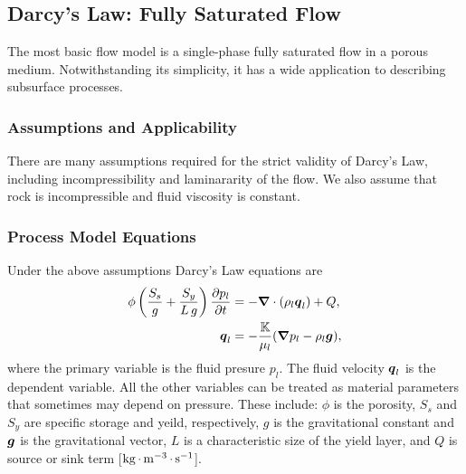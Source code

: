 
\subsection{Darcy's Law: Fully Saturated Flow}
\label{sec:flow-single-phase}

The most basic flow model is a single-phase fully saturated flow in a porous medium.  
Notwithstanding its simplicity, it has a wide application to
describing subsurface processes.


\subsubsection{Assumptions and Applicability}

There are many assumptions required for the strict validity of Darcy's Law, 
including incompressibility and laminararity of the flow.
We also assume that rock is incompressible and fluid viscosity is constant.


\subsubsection{Process Model Equations}

Under the above assumptions Darcy's Law equations are
\begin{subequations}
\label{eq:Darcy fully saturated}
\begin{align}
  \phi \left(\displaystyle \frac{S_s}{g} + \displaystyle \frac{S_y}{L\,g}\right) \frac{\partial p_l}{\partial t} 
  &=
  -\boldsymbol{\nabla} \cdot (\rho_l \boldsymbol{q}_l) + Q,
  \\
  {\boldsymbol{q}}_l &= -\frac{{\mathbb K}}{\mu_l} 
  ({\boldsymbol{\nabla}} p_l - \rho_l {\boldsymbol{g}}),
\end{align}
\end{subequations}
where the primary variable is the fluid presure $p_l$. 
The fluid velocity ${\boldsymbol{q}}_l$ is the dependent variable.
All the other variables can be treated as material parameters
that sometimes may depend on pressure.
These include:
$\phi$ is the porosity,
$S_s$ and $S_y$ are specific storage and yeild, respectively,
$g$ is the gravitational constant
and ${\boldsymbol{g}}$ is the gravitational vector,  
$L$ is a characteristic size of the yield layer, and 
$Q$ is source or sink term [${\rm kg} {\,\cdot\,} {\rm m}^{-3} {\,\cdot\,} {\rm s}^{-1}$].
 

